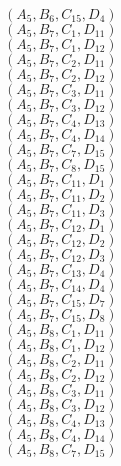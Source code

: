 \documentclass[14pt]{article}
\begin{document}
    $({A}_{5}, {B}_{6}, {C}_{15}, {D}_{4}) $ \\ 
    $({A}_{5}, {B}_{7}, {C}_{1}, {D}_{11}) $ \\ 
    $({A}_{5}, {B}_{7}, {C}_{1}, {D}_{12}) $ \\ 
    $({A}_{5}, {B}_{7}, {C}_{2}, {D}_{11}) $ \\ 
    $({A}_{5}, {B}_{7}, {C}_{2}, {D}_{12}) $ \\ 
    $({A}_{5}, {B}_{7}, {C}_{3}, {D}_{11}) $ \\ 
    $({A}_{5}, {B}_{7}, {C}_{3}, {D}_{12}) $ \\ 
    $({A}_{5}, {B}_{7}, {C}_{4}, {D}_{13}) $ \\ 
    $({A}_{5}, {B}_{7}, {C}_{4}, {D}_{14}) $ \\ 
    $({A}_{5}, {B}_{7}, {C}_{7}, {D}_{15}) $ \\ 
    $({A}_{5}, {B}_{7}, {C}_{8}, {D}_{15}) $ \\ 
    $({A}_{5}, {B}_{7}, {C}_{11}, {D}_{1}) $ \\ 
    $({A}_{5}, {B}_{7}, {C}_{11}, {D}_{2}) $ \\ 
    $({A}_{5}, {B}_{7}, {C}_{11}, {D}_{3}) $ \\ 
    $({A}_{5}, {B}_{7}, {C}_{12}, {D}_{1}) $ \\ 
    $({A}_{5}, {B}_{7}, {C}_{12}, {D}_{2}) $ \\ 
    $({A}_{5}, {B}_{7}, {C}_{12}, {D}_{3}) $ \\ 
    $({A}_{5}, {B}_{7}, {C}_{13}, {D}_{4}) $ \\ 
    $({A}_{5}, {B}_{7}, {C}_{14}, {D}_{4}) $ \\ 
    $({A}_{5}, {B}_{7}, {C}_{15}, {D}_{7}) $ \\ 
    $({A}_{5}, {B}_{7}, {C}_{15}, {D}_{8}) $ \\ 
    $({A}_{5}, {B}_{8}, {C}_{1}, {D}_{11}) $ \\ 
    $({A}_{5}, {B}_{8}, {C}_{1}, {D}_{12}) $ \\ 
    $({A}_{5}, {B}_{8}, {C}_{2}, {D}_{11}) $ \\ 
    $({A}_{5}, {B}_{8}, {C}_{2}, {D}_{12}) $ \\ 
    $({A}_{5}, {B}_{8}, {C}_{3}, {D}_{11}) $ \\ 
    $({A}_{5}, {B}_{8}, {C}_{3}, {D}_{12}) $ \\ 
    $({A}_{5}, {B}_{8}, {C}_{4}, {D}_{13}) $ \\ 
    $({A}_{5}, {B}_{8}, {C}_{4}, {D}_{14}) $ \\ 
    $({A}_{5}, {B}_{8}, {C}_{7}, {D}_{15}) $ \\ 
\end{document}
